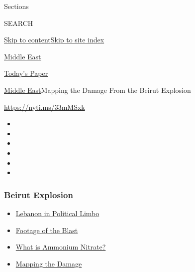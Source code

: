 Sections

SEARCH

\protect\hyperlink{site-content}{Skip to
content}\protect\hyperlink{site-index}{Skip to site index}

\href{https://www.nytimes3xbfgragh.onion/section/world/middleeast}{Middle
East}

\href{https://myaccount.nytimes3xbfgragh.onion/auth/login?response_type=cookie\&client_id=vi}{}

\href{https://www.nytimes3xbfgragh.onion/section/todayspaper}{Today's
Paper}

\href{/section/world/middleeast}{Middle East}\textbar{}Mapping the
Damage From the Beirut Explosion

\url{https://nyti.ms/33mMSxk}

\begin{itemize}
\item
\item
\item
\item
\item
\item
\end{itemize}

\hypertarget{beirut-explosion}{%
\subsubsection{Beirut Explosion}\label{beirut-explosion}}

\begin{itemize}
\tightlist
\item
  \href{https://www.nytimes3xbfgragh.onion/2020/08/11/world/middleeast/lebanon-government-resigns-explainer.html?name=styln-beirut\&region=TOP_BANNER\&variant=undefined\&block=storyline_menu_recirc\&action=click\&pgtype=Interactive\&impression_id=d4440f00-e38f-11ea-a0fd-ad25549458e4}{Lebanon
  in Political Limbo}
\item
  \href{https://www.nytimes3xbfgragh.onion/2020/08/05/video/beirut-explosion-footage.html?name=styln-beirut\&region=TOP_BANNER\&variant=undefined\&block=storyline_menu_recirc\&action=click\&pgtype=Interactive\&impression_id=d4443610-e38f-11ea-a0fd-ad25549458e4}{Footage
  of the Blast}
\item
  \href{https://www.nytimes3xbfgragh.onion/2020/08/05/world/middleeast/beirut-explosion-ammonium-nitrate.html?name=styln-beirut\&region=TOP_BANNER\&variant=undefined\&block=storyline_menu_recirc\&action=click\&pgtype=Interactive\&impression_id=d4443611-e38f-11ea-a0fd-ad25549458e4}{What
  is Ammonium Nitrate?}
\item
  \href{https://www.nytimes3xbfgragh.onion/interactive/2020/08/04/world/middleeast/beirut-explosion-damage.html?name=styln-beirut\&region=TOP_BANNER\&variant=undefined\&block=storyline_menu_recirc\&action=click\&pgtype=Interactive\&impression_id=d4443612-e38f-11ea-a0fd-ad25549458e4}{Mapping
  the Damage}
\end{itemize}

